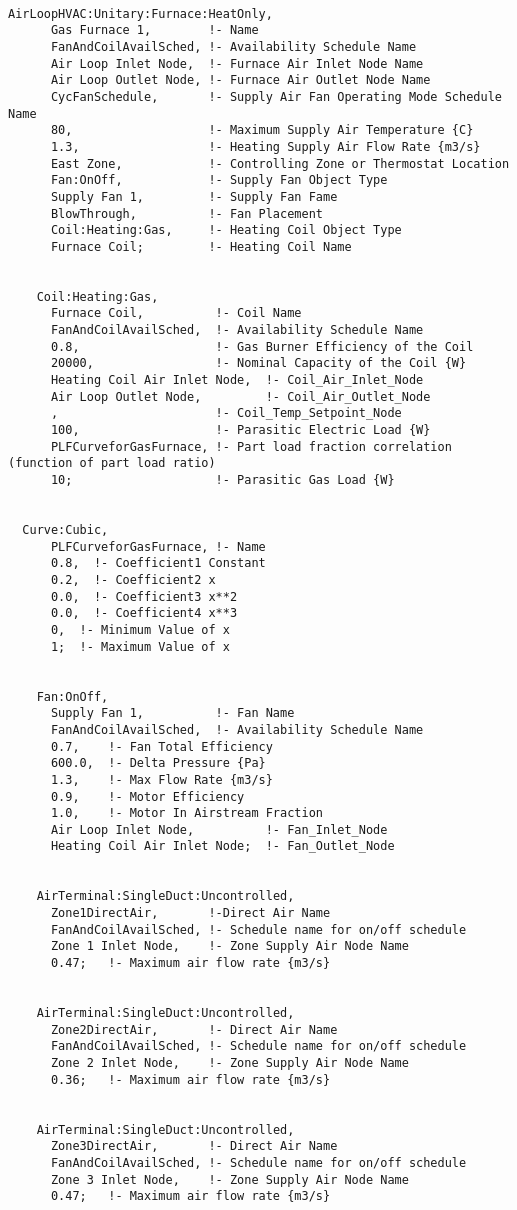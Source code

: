 \begin{lstlisting}

AirLoopHVAC:Unitary:Furnace:HeatOnly,
      Gas Furnace 1,        !- Name
      FanAndCoilAvailSched, !- Availability Schedule Name
      Air Loop Inlet Node,  !- Furnace Air Inlet Node Name
      Air Loop Outlet Node, !- Furnace Air Outlet Node Name
      CycFanSchedule,       !- Supply Air Fan Operating Mode Schedule Name
      80,                   !- Maximum Supply Air Temperature {C}
      1.3,                  !- Heating Supply Air Flow Rate {m3/s}
      East Zone,            !- Controlling Zone or Thermostat Location
      Fan:OnOff,            !- Supply Fan Object Type
      Supply Fan 1,         !- Supply Fan Fame
      BlowThrough,          !- Fan Placement
      Coil:Heating:Gas,     !- Heating Coil Object Type
      Furnace Coil;         !- Heating Coil Name


    Coil:Heating:Gas,
      Furnace Coil,          !- Coil Name
      FanAndCoilAvailSched,  !- Availability Schedule Name
      0.8,                   !- Gas Burner Efficiency of the Coil
      20000,                 !- Nominal Capacity of the Coil {W}
      Heating Coil Air Inlet Node,  !- Coil_Air_Inlet_Node
      Air Loop Outlet Node,         !- Coil_Air_Outlet_Node
      ,                      !- Coil_Temp_Setpoint_Node
      100,                   !- Parasitic Electric Load {W}
      PLFCurveforGasFurnace, !- Part load fraction correlation (function of part load ratio)
      10;                    !- Parasitic Gas Load {W}


  Curve:Cubic,
      PLFCurveforGasFurnace, !- Name
      0.8,  !- Coefficient1 Constant
      0.2,  !- Coefficient2 x
      0.0,  !- Coefficient3 x**2
      0.0,  !- Coefficient4 x**3
      0,  !- Minimum Value of x
      1;  !- Maximum Value of x


    Fan:OnOff,
      Supply Fan 1,          !- Fan Name
      FanAndCoilAvailSched,  !- Availability Schedule Name
      0.7,    !- Fan Total Efficiency
      600.0,  !- Delta Pressure {Pa}
      1.3,    !- Max Flow Rate {m3/s}
      0.9,    !- Motor Efficiency
      1.0,    !- Motor In Airstream Fraction
      Air Loop Inlet Node,          !- Fan_Inlet_Node
      Heating Coil Air Inlet Node;  !- Fan_Outlet_Node


    AirTerminal:SingleDuct:Uncontrolled,
      Zone1DirectAir,       !-Direct Air Name
      FanAndCoilAvailSched, !- Schedule name for on/off schedule
      Zone 1 Inlet Node,    !- Zone Supply Air Node Name
      0.47;   !- Maximum air flow rate {m3/s}


    AirTerminal:SingleDuct:Uncontrolled,
      Zone2DirectAir,       !- Direct Air Name
      FanAndCoilAvailSched, !- Schedule name for on/off schedule
      Zone 2 Inlet Node,    !- Zone Supply Air Node Name
      0.36;   !- Maximum air flow rate {m3/s}


    AirTerminal:SingleDuct:Uncontrolled,
      Zone3DirectAir,       !- Direct Air Name
      FanAndCoilAvailSched, !- Schedule name for on/off schedule
      Zone 3 Inlet Node,    !- Zone Supply Air Node Name
      0.47;   !- Maximum air flow rate {m3/s}
\end{lstlisting}

